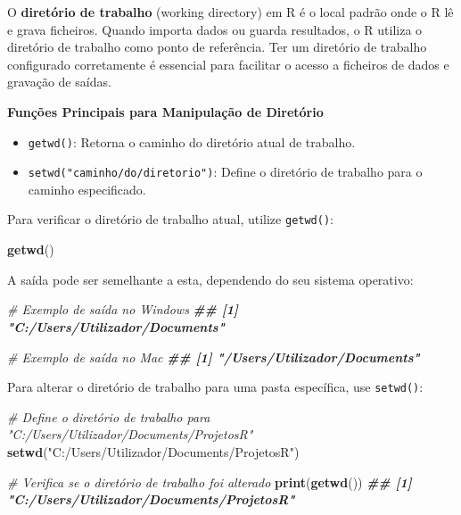 \documentclass[
]{book}
\newenvironment{Shaded}{\begin{snugshade}}{\end{snugshade}}
\newcommand{\CommentTok}[1]{\textcolor[rgb]{0.56,0.35,0.01}{\textit{#1}}}
\newcommand{\DocumentationTok}[1]{\textcolor[rgb]{0.56,0.35,0.01}{\textbf{\textit{#1}}}}
\newcommand{\FunctionTok}[1]{\textcolor[rgb]{0.13,0.29,0.53}{\textbf{#1}}}
\newcommand{\NormalTok}[1]{#1}
\newcommand{\StringTok}[1]{\textcolor[rgb]{0.31,0.60,0.02}{#1}}
\providecommand{\tightlist}{%
  \setlength{\itemsep}{0pt}\setlength{\parskip}{0pt}}
\begin{document}
O \textbf{diretório de trabalho} (working directory) em R é o local padrão
onde o R lê e grava ficheiros. Quando importa dados ou guarda
resultados, o R utiliza o diretório de trabalho como ponto de
referência. Ter um diretório de trabalho configurado corretamente é
essencial para facilitar o acesso a ficheiros de dados e gravação de
saídas.

\textbf{Funções Principais para Manipulação de Diretório}

\begin{itemize}
\tightlist
\item
  \texttt{getwd()}: Retorna o caminho do diretório atual de trabalho.
\item
  \texttt{setwd("caminho/do/diretorio")}: Define o diretório de trabalho para
  o caminho especificado.
\end{itemize}

Para verificar o diretório de trabalho atual, utilize \texttt{getwd()}:

\begin{Shaded}
\begin{Highlighting}[]
\FunctionTok{getwd}\NormalTok{()}
\end{Highlighting}
\end{Shaded}

A saída pode ser semelhante a esta, dependendo do seu sistema operativo:

\begin{Shaded}
\begin{Highlighting}[]
\CommentTok{\# Exemplo de saída no Windows}
\DocumentationTok{\#\# [1] "C:/Users/Utilizador/Documents"}

\CommentTok{\# Exemplo de saída no Mac}
\DocumentationTok{\#\# [1] "/Users/Utilizador/Documents"}
\end{Highlighting}
\end{Shaded}

Para alterar o diretório de trabalho para uma pasta específica, use
\texttt{setwd()}:

\begin{Shaded}
\begin{Highlighting}[]
\CommentTok{\# Define o diretório de trabalho para "C:/Users/Utilizador/Documents/ProjetosR"}
\FunctionTok{setwd}\NormalTok{(}\StringTok{"C:/Users/Utilizador/Documents/ProjetosR"}\NormalTok{)}

\CommentTok{\# Verifica se o diretório de trabalho foi alterado}
\FunctionTok{print}\NormalTok{(}\FunctionTok{getwd}\NormalTok{())}
\DocumentationTok{\#\# [1] "C:/Users/Utilizador/Documents/ProjetosR"}
\end{Highlighting}
\end{Shaded}
\end{document}

